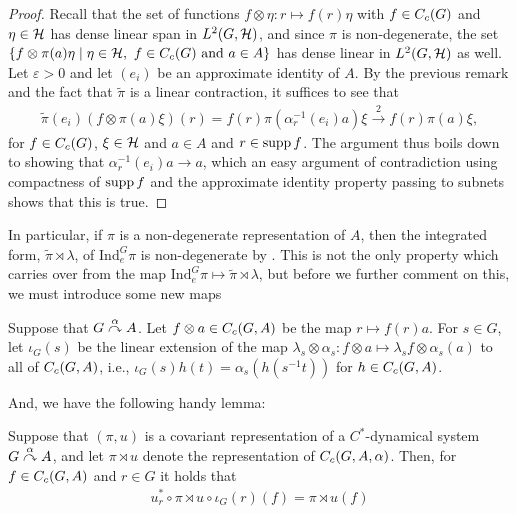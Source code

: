 \begin{proof}
Recall that the set of functions $ f \otimes \eta \colon r \mapsto f(r) \eta$ with $f \in C_c(G)$ and $\eta \in \mathcal{H}$ has dense linear span in $L^2(G,\mathcal{H})$, and since $\pi$ is non-degenerate, the set $\{ f \otimes \pi(a) \eta \mid \eta \in \mathcal{H}, \ f \in C_c(G) \text{ and } a \in A \}$ has dense linear in $L^2(G, \mathcal{H})$ as well. Let $\varepsilon > 0$ and let $(e_i)$ be an approximate identity of $A$. By the previous remark and the fact that $\tilde{\pi}$ is a linear contraction, it suffices to see that 
\begin{align*}
	\tilde{\pi}(e_i) (f \otimes \pi(a) \xi)(r)=f(r) \pi(\alpha_{r}^{-1}(e_i)a) \xi   \stackrel 2 \to f(r) \pi(a) \xi,
\end{align*}
for $f \in C_c(G)$, $\xi \in \mathcal{H}$ and $a \in A$ and $r \in \operatorname{supp} f$. The argument thus boils down to showing that $\alpha_r^{-1}(e_i) a \to a$, which an easy argument of contradiction using compactness of $\operatorname{supp} f$ and the approximate identity property passing to subnets shows that this is true.
\end{proof}
\begin{remark}
In particular, if $\pi$ is a non-degenerate representation of $A$, then the integrated form, $\tilde{\pi} \rtimes \lambda$, of $\mathrm{Ind}_e^G \pi$ is non-degenerate by . This is not the only property which carries over from the map $\mathrm{Ind}_e^G \pi \mapsto \tilde{\pi} \rtimes \lambda$, but before we further comment on this, we must introduce some new maps
\end{remark}
\begin{definition}
Suppose that $G \stackrel{\alpha}{\curvearrowright} A$. Let $f \otimes a  \in C_c(G,A)$ be the map $r \mapsto f(r)a$. For $s \in G$, let $\iota_G(s)$ be the linear extension of the map $\lambda_s \otimes \alpha_s \colon f \otimes a \mapsto \lambda_s f \otimes \alpha_s(a)$ to all of $C_c(G,A)$, i.e., $\iota_G(s) h(t) = \alpha_s(h(s^{-1}t))$ for $h \in C_c(G,A)$.
\end{definition}
And, we have the following handy lemma:
\begin{lemma}
Suppose that $(\pi,u)$ is a covariant representation of a $C^*$-dynamical system $G \stackrel{\alpha}{\curvearrowright} A$, and let $\pi \rtimes u$ denote the representation of $C_c(G,A,\alpha)$. Then, for $f \in C_c(G,A)$ and $r \in G$ it holds that
\begin{align*}
	 u_r^*  \circ \pi \rtimes u \circ \iota_G(r) (f) =   \pi \rtimes u (f)
\end{align*}
\label{cross:iotaG}
\end{lemma}
